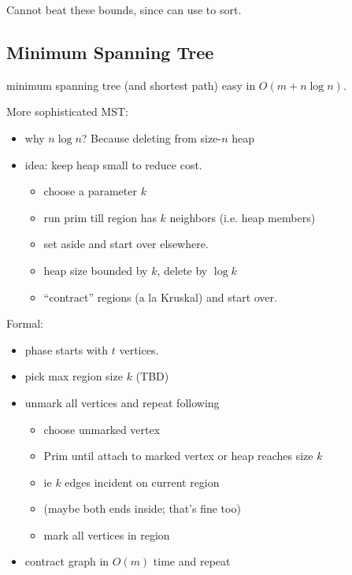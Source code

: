 \documentclass{article}
\begin{document}
Cannot beat these bounds, since can use to sort.

\subsection{Minimum Spanning Tree}


minimum spanning tree (and shortest path) easy in $O(m+n\log n)$.

More sophisticated MST:
\begin{itemize}
\item why $n\log n$?  Because deleting from size-$n$ heap
\item idea: keep heap small to reduce cost.
\begin{itemize}
\item choose a parameter $k$
\item run prim till region has $k$ neighbors (i.e. heap members)
\item set aside and start over elsewhere.
\item heap size bounded by $k$, delete by $\log k$
\item ``contract'' regions (a la Kruskal) and start over.
\end{itemize}
\end{itemize}

Formal:
\begin{itemize}
\item phase starts with $t$ vertices.  
\item pick max region size $k$ (TBD)
\item unmark all vertices and repeat following
\begin{itemize}
\item choose unmarked vertex
\item Prim until attach to marked vertex or heap reaches size $k$
\item ie $k$ edges incident on current region
\item (maybe both ends inside; that's fine too)
\item mark all vertices in region
\end{itemize}
\item contract graph in $O(m)$ time and repeat
\end{itemize}
\end{document}
